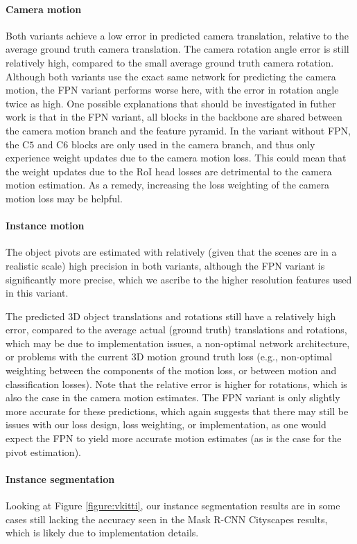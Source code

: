 \paragraph{Camera motion}
Both variants achieve a low error in predicted camera translation, relative to
the average ground truth camera translation. The camera rotation angle error
is still relatively high, compared to the small average ground truth camera rotation.
Although both variants use the exact same network for predicting the camera motion,
the FPN variant performs worse here, with the error in rotation angle twice as high.
One possible explanations that should be investigated in futher work is
that in the FPN variant, all blocks in the backbone are shared between the camera
motion branch and the feature pyramid. In the variant without FPN, the C$5$ and
C$6$ blocks are only used in the camera branch, and thus only experience weight
updates due to the camera motion loss. This could mean that the weight updates due
to the RoI head losses are detrimental to the camera motion estimation.
As a remedy, increasing the loss weighting of the camera motion loss may be
helpful.

\paragraph{Instance motion}
The object pivots are estimated with relatively (given that the scenes are in a realistic scale)
high precision in both variants, although the FPN variant is significantly more
precise, which we ascribe to the higher resolution features used in this variant.

The predicted 3D object translations and rotations still have a relatively high
error, compared to the average actual (ground truth) translations and rotations,
which may be due to implementation issues, a non-optimal network architecture,
or problems with the current 3D motion ground truth loss
(e.g., non-optimal weighting between the components of the motion loss, or between motion and classification losses).
Note that the relative error is higher for rotations, which is
also the case in the camera motion estimates.
The FPN variant is only slightly more accurate for these predictions, which again suggests
that there may still be issues with our loss design, loss weighting, or implementation, as one would expect the
FPN to yield more accurate motion estimates (as is the case for the pivot estimation).

\paragraph{Instance segmentation}
Looking at Figure \ref{figure:vkitti}, our instance segmentation results are in
some cases still lacking the accuracy seen in the Mask R-CNN Cityscapes \cite{MaskRCNN} results,
which is likely due to implementation details.
